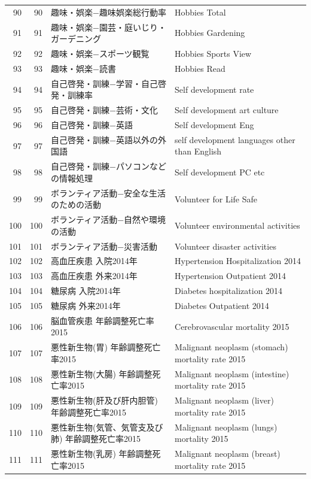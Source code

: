 \begin{table}[ht]
\begin{tabular}{rrll}
  90 &  90 & 趣味・娯楽−趣味娯楽総行動率 & Hobbies Total \\ 
  91 &  91 & 趣味・娯楽−園芸・庭いじり・ガーデニング & Hobbies Gardening \\ 
  92 &  92 & 趣味・娯楽−スポーツ観覧 & Hobbies Sports View \\ 
  93 &  93 & 趣味・娯楽−読書 & Hobbies Read \\ 
  94 &  94 & 自己啓発・訓練−学習・自己啓発・訓練率 & Self development rate \\ 
  95 &  95 & 自己啓発・訓練−芸術・文化 & Self development art culture \\ 
  96 &  96 & 自己啓発・訓練−英語 & Self development Eng \\ 
97 &  97 & 自己啓発・訓練−英語以外の外国語 & self development languages other than English\\
    98 &  98 & 自己啓発・訓練−パソコンなどの情報処理 & Self development PC etc \\ 
  99 &  99 & ボランティア活動−安全な生活のための活動 & Volunteer for Life Safe \\ 
  100 & 100 & ボランティア活動−自然や環境の活動 & Volunteer environmental activities \\ 
  101 & 101 & ボランティア活動−災害活動 & Volunteer disaster activities \\ 
  102 & 102 & 高血圧疾患 入院2014年 & Hypertension Hospitalization 2014 \\ 
  103 & 103 & 高血圧疾患 外来2014年 & Hypertension Outpatient 2014 \\ 
  104 & 104 & 糖尿病 入院2014年 & Diabetes hospitalization 2014 \\ 
  105 & 105 & 糖尿病 外来2014年 & Diabetes Outpatient 2014 \\ 
  106 & 106 & 脳血管疾患 年齢調整死亡率2015 & Cerebrovascular mortality 2015 \\ 
  107 & 107 & 悪性新生物(胃) 年齢調整死亡率2015 & Malignant neoplasm (stomach) mortality rate 2015 \\ 
  108 & 108 & 悪性新生物(大腸) 年齢調整死亡率2015 & Malignant neoplasm (intestine) mortality rate 2015 \\ 
  109 & 109 & 悪性新生物(肝及び肝内胆管) 年齢調整死亡率2015 & Malignant neoplasm (liver) mortality rate 2015 \\ 
  110 & 110 & 悪性新生物(気管、気管支及び肺) 年齢調整死亡率2015 & Malignant neoplasm (lungs) mortality 2015 \\ 
  111 & 111 & 悪性新生物(乳房) 年齢調整死亡率2015 & Malignant neoplasm (breast) mortality rate 2015 \\ 

\end{tabular}
\end{table}
